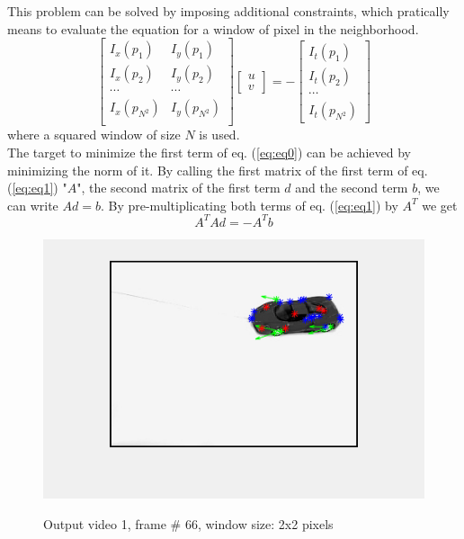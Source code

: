 \documentclass[11pt]{article}
\begin{document}
This problem can be solved by imposing additional constraints, which pratically means to evaluate the equation for a window of pixel in the neighborhood.
\begin{equation}
\label{eq:eq1}
\begin{bmatrix}
I_x(p_1) & I_y(p_1)\\
I_x(p_2) & I_y(p_2)\\
\cdots & \cdots\\
I_x(p_{N^2}) & I_y(p_{N^2})\\
\end{bmatrix}
\begin{bmatrix}
u\\
v
\end{bmatrix}
= - 
\begin{bmatrix}
I_t(p_1)\\
I_t(p_2)\\
\cdots\\
I_t(p_{N^2})
\end{bmatrix}
\end{equation}
where a squared window of size $N$ is used.\\
The target to minimize the first term of eq. (\ref{eq:eq0}) can be achieved by minimizing the norm of it. By calling the first matrix of the first term of eq. (\ref{eq:eq1}) "$A$", the second matrix of the first term $d$ and the second term $b$, we can write $A d = b$. By pre-multiplicating both terms of eq. (\ref{eq:eq1}) by $A^T$ we get
\begin{equation}
A^T A d = -A^T b
\end{equation}
\begin{figure}[H]
	\centering
	{\includegraphics[width=12cm]{images/out_1_66_w2x2.png} }
    \caption{Output video 1, frame \# 66, window size: 2x2 pixels}
    \label{fig:out1_1}
\end{figure}
\end{document}
